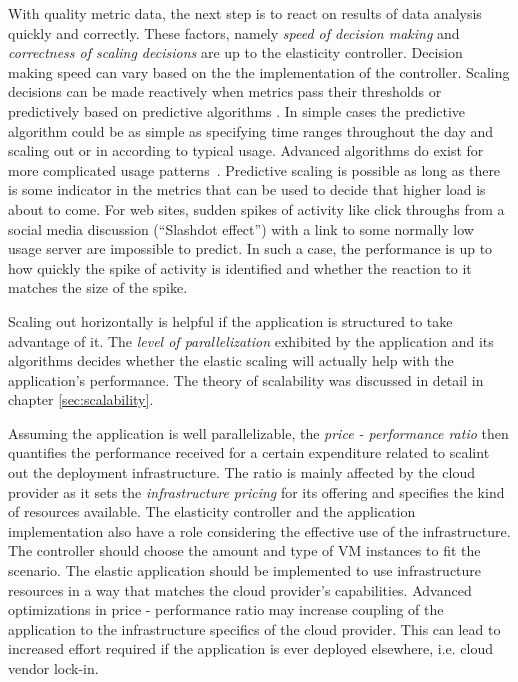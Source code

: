 \documentclass[english]{tktltiki2}
\theoremstyle{definition}
\theoremstyle{remark}
\begin{document}
With quality metric data, the next step is to react on results of data analysis
quickly and correctly. These factors, namely \textit{speed of decision making}
and \textit{correctness of scaling decisions} are up to the elasticity
controller. Decision making speed can vary based on the the implementation of
the controller. Scaling decisions can be made reactively when metrics pass their
thresholds or predictively based on predictive algorithms . In simple cases the
predictive algorithm could be as simple as specifying time ranges throughout the
day and scaling out or in according to typical usage. Advanced algorithms do
exist for more complicated usage patterns~\cite{Iqbal2011}\cite{Tan2012}\cite{Roy2011}\cite{Chen2011}\cite{Wilkes2010}\cite{Cunha2011}. Predictive scaling is
possible as long as there is some indicator in the metrics that can be used to
decide that higher load is about to come. For web sites, sudden spikes of
activity like click throughs from a social media discussion (``Slashdot
effect'') with a link to some normally low usage server are impossible to
predict. In such a case, the performance is up to how quickly the spike of
activity is identified and whether the reaction to it matches the size of the
spike.

Scaling out horizontally is helpful if the application is structured to take
advantage of it. The \textit{level of parallelization} exhibited by the
application and its algorithms decides whether the elastic scaling will actually
help with the application's performance. The theory of scalability was discussed
in detail in chapter \ref{sec:scalability}.

Assuming the application is well parallelizable, the \textit{price - performance
ratio} then quantifies the performance received for a certain expenditure
related to scalint out the deployment infrastructure. The ratio is mainly
affected by the cloud provider as it sets the \textit{infrastructure pricing}
for its offering and specifies the kind of resources available. The elasticity
controller and the application implementation also have a role considering the
effective use of the infrastructure. The controller should choose the amount and
type of VM instances to fit the scenario. The elastic application should be
implemented to use infrastructure resources in a way that matches the cloud
provider's capabilities. Advanced optimizations in price - performance ratio may
increase coupling of the application to the infrastructure specifics of the
cloud provider. This can lead to increased effort required if the application is
ever deployed elsewhere, i.e. cloud vendor lock-in.
\end{document}
